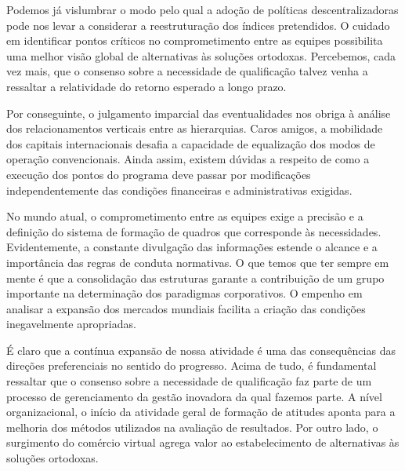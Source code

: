 \documentclass[
	12pt,				%
	oneside,			%
	a4paper,			%
	english,			%
	french,				%
	spanish,			%
	brazil				%
	]{abntex2}
\begin{document}
Podemos já vislumbrar o modo pelo qual a adoção de políticas
descentralizadoras pode nos levar a considerar a reestruturação dos
índices pretendidos. O cuidado em identificar pontos críticos no
comprometimento entre as equipes possibilita uma melhor visão global de
alternativas às soluções ortodoxas. Percebemos, cada vez mais, que o
consenso sobre a necessidade de qualificação talvez venha a ressaltar a
relatividade do retorno esperado a longo prazo.

Por conseguinte, o julgamento imparcial das eventualidades nos obriga à
análise dos relacionamentos verticais entre as hierarquias. Caros
amigos, a mobilidade dos capitais internacionais desafia a capacidade de
equalização dos modos de operação convencionais. Ainda assim, existem
dúvidas a respeito de como a execução dos pontos do programa deve passar
por modificações independentemente das condições financeiras e
administrativas exigidas.

No mundo atual, o comprometimento entre as equipes exige a precisão e a
definição do sistema de formação de quadros que corresponde às
necessidades. Evidentemente, a constante divulgação das informações
estende o alcance e a importância das regras de conduta normativas. O
que temos que ter sempre em mente é que a consolidação das estruturas
garante a contribuição de um grupo importante na determinação dos
paradigmas corporativos. O empenho em analisar a expansão dos mercados
mundiais facilita a criação das condições inegavelmente apropriadas.

É claro que a contínua expansão de nossa atividade é uma das
consequências das direções preferenciais no sentido do progresso. Acima
de tudo, é fundamental ressaltar que o consenso sobre a necessidade de
qualificação faz parte de um processo de gerenciamento da gestão
inovadora da qual fazemos parte. A nível organizacional, o início da
atividade geral de formação de atitudes aponta para a melhoria dos
métodos utilizados na avaliação de resultados. Por outro lado, o
surgimento do comércio virtual agrega valor ao estabelecimento de
alternativas às soluções ortodoxas.

\postextual

\postextual



\end{document}
